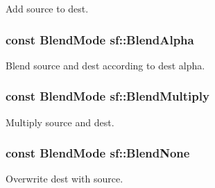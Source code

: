 Add source to dest. 

\hypertarget{namespacesf_a7747d95d2e1f108142ea7c760c0b266c}{
\subsubsection[{Blend\-Alpha}]{ {\bf const} {\bf Blend\-Mode} sf\-::\-Blend\-Alpha}}\label{namespacesf_a7747d95d2e1f108142ea7c760c0b266c}


Blend source and dest according to dest alpha. 

\hypertarget{namespacesf_ad8622674d06322d447de6ea0c95c83b4}{
\subsubsection[{Blend\-Multiply}]{ {\bf const} {\bf Blend\-Mode} sf\-::\-Blend\-Multiply}}\label{namespacesf_ad8622674d06322d447de6ea0c95c83b4}


Multiply source and dest. 

\hypertarget{namespacesf_aaa5511bd6fcf3573d61945b6d70a20ab}{
\subsubsection[{Blend\-None}]{ {\bf const} {\bf Blend\-Mode} sf\-::\-Blend\-None}}\label{namespacesf_aaa5511bd6fcf3573d61945b6d70a20ab}


Overwrite dest with source. 

